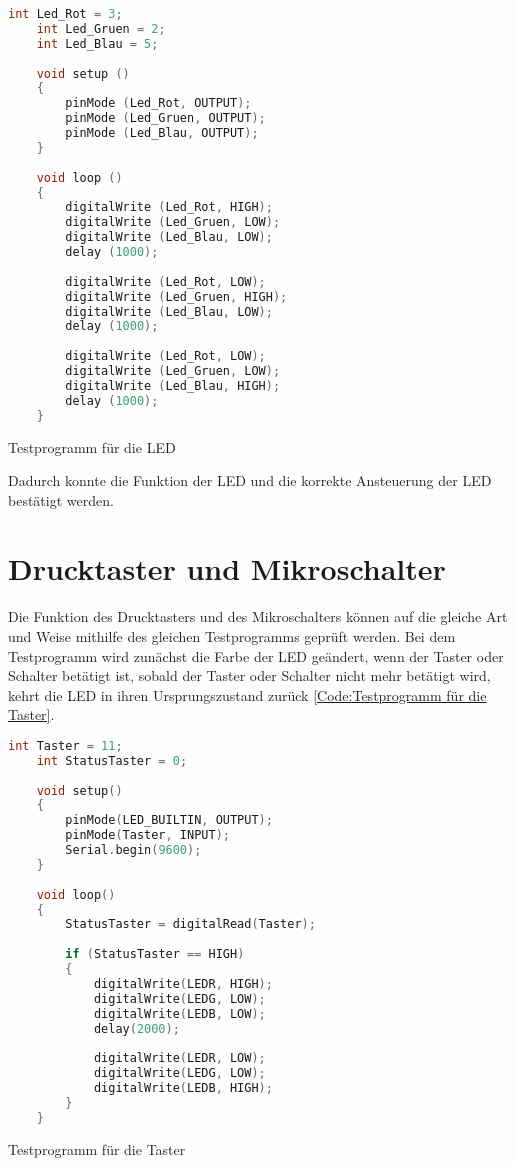 \begin{code}[H]
	\begin{lstlisting}[language=c++]
	int Led_Rot = 3;
	int Led_Gruen = 2;
	int Led_Blau = 5;
	
	void setup ()
	{
		pinMode (Led_Rot, OUTPUT); 
		pinMode (Led_Gruen, OUTPUT);
		pinMode (Led_Blau, OUTPUT); 
	}
	
	void loop ()
	{
		digitalWrite (Led_Rot, HIGH);
		digitalWrite (Led_Gruen, LOW);
		digitalWrite (Led_Blau, LOW);
		delay (1000);
		
		digitalWrite (Led_Rot, LOW);
		digitalWrite (Led_Gruen, HIGH);
		digitalWrite (Led_Blau, LOW);
		delay (1000);
		
		digitalWrite (Led_Rot, LOW);
		digitalWrite (Led_Gruen, LOW);
		digitalWrite (Led_Blau, HIGH);
		delay (1000);
	}
\end{lstlisting}      

\caption[Testprogramm für die LED]{Testprogramm für die LED}\label{Code:Testprogramm für die LED}    
\end{code} 

Dadurch konnte die Funktion der LED und die korrekte Ansteuerung der LED bestätigt werden.

\section{Drucktaster und Mikroschalter}

Die Funktion des Drucktasters und des Mikroschalters können auf die gleiche Art und Weise mithilfe des gleichen Testprogramms geprüft werden. Bei dem Testprogramm wird zunächst die Farbe der LED geändert, wenn der Taster oder Schalter betätigt ist, sobald der Taster oder Schalter nicht mehr betätigt wird, kehrt die LED in ihren Ursprungszustand zurück \ref{Code:Testprogramm für die Taster}.

\begin{code}[H]
	\begin{lstlisting}[language=c++]
	int Taster = 11;
	int StatusTaster = 0;
	
	void setup()
	{
		pinMode(LED_BUILTIN, OUTPUT);
		pinMode(Taster, INPUT);
		Serial.begin(9600);
	}
	
	void loop()
	{
		StatusTaster = digitalRead(Taster);
		
		if (StatusTaster == HIGH)
		{
			digitalWrite(LEDR, HIGH);
			digitalWrite(LEDG, LOW);
			digitalWrite(LEDB, LOW);
			delay(2000);
			
			digitalWrite(LEDR, LOW);
			digitalWrite(LEDG, LOW);
			digitalWrite(LEDB, HIGH);
		}
	}
\end{lstlisting}      

\caption[Testprogramm für die Taster]{Testprogramm für die Taster}\label{Code:Testprogramm für die Taster}    
\end{code} 

